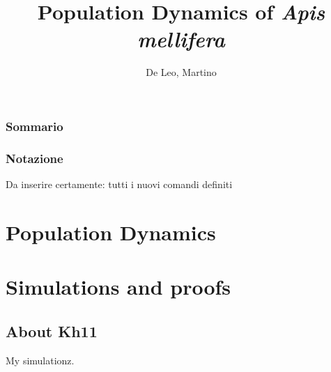 \documentclass[12pt,a4paper,oneside,hidelinks]{book} %
\author{De Leo, Martino}
\title{Population Dynamics of \emph{Apis mellifera} }
\begin{document}
\maketitle %

\frontmatter

\section*{Sommario}


\section*{Notazione}
Da inserire certamente: tutti i nuovi comandi definiti

\cleardoublepage

\tableofcontents

\listoffigures



\mainmatter

\clearpage
\part{Population Dynamics}






\part{Simulations and proofs}

\chapter{About Kh11}
My simulationz.





\appendix



\backmatter

\cleardoublepage
{}
\nocite{*} %
\printbibliography
\end{document}
